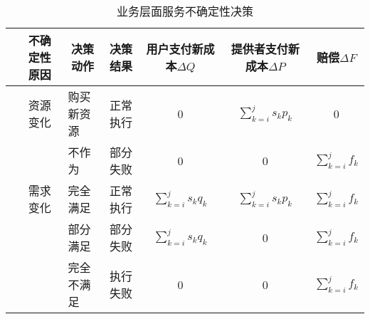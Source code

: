 \begin{table}[htbp]
    \caption{业务层面服务不确定性决策}
    \vspace{-0.5em}\label{table:state_action_business}\centering{}
    \begin{threeparttable}
        \begin{tabular}{lllllll}
            \toprule
            & \multicolumn{1}{c}{不确定性原因} 
            & \multicolumn{1}{c}{{决策动作}} 
            & \multicolumn{1}{c}{决策结果} 
            & \multicolumn{1}{c}{用户支付新成本$\Delta Q$} 
            & \multicolumn{1}{c}{提供者支付新成本$\Delta P$} 
            & \multicolumn{1}{c}{赔偿$\Delta F$} \\
            \hline

            & \multicolumn{1}{c}{资源变化} 
            & \multicolumn{1}{l}{购买新资源} 
            & \multicolumn{1}{c}{正常执行} 
            & \multicolumn{1}{c}{0} 
            & \multicolumn{1}{c}{$\sum\limits_{k = i}^j {{s_k}{p_k}}$\tnote{1}} 
            & \multicolumn{1}{c}{0} \\
            
            & \multicolumn{1}{c}{} 
            & \multicolumn{1}{l}{不作为} 
            & \multicolumn{1}{c}{部分失败\tnote{2}} 
            & \multicolumn{1}{c}{0} 
            & \multicolumn{1}{c}{0} 
            & \multicolumn{1}{c}{$\sum\limits_{k = i}^j {{f_k}}$\tnote{3}} \\
            
            & \multicolumn{1}{c}{需求变化} 
            & \multicolumn{1}{l}{完全满足} 
            & \multicolumn{1}{c}{正常执行} 
            & \multicolumn{1}{c}{$\sum\limits_{k = i}^j {{s_k}{q_k}}$\tnote{4}} 
            & \multicolumn{1}{c}{$\sum\limits_{k = i}^j {{s_k}{p_k}}$} 
            & \multicolumn{1}{c}{$\sum\limits_{k = i}^j {{f_k}}$} \\
            
            & \multicolumn{1}{c}{} 
            & \multicolumn{1}{l}{部分满足} 
            & \multicolumn{1}{c}{部分失败} 
            & \multicolumn{1}{c}{$\sum\limits_{k = i}^j {{s_k}{q_k}}$\tnote{4}} 
            & \multicolumn{1}{c}{0} 
            & \multicolumn{1}{c}{$\sum\limits_{k = i}^j {{f_k}}$} \\
            
            & \multicolumn{1}{c}{} 
            & \multicolumn{1}{l}{完全不满足} 
            & \multicolumn{1}{c}{执行失败} 
            & \multicolumn{1}{c}{0} 
            & \multicolumn{1}{c}{0} 
            & \multicolumn{1}{c}{$\sum\limits_{k = i}^j {{f_k}}$} \\
            \bottomrule
            

\end{tabular}
\end{threeparttable}
\end{table}
